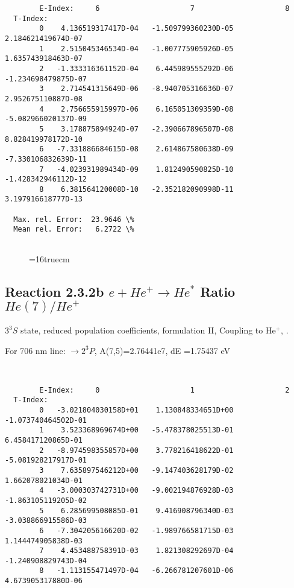 \documentclass[12pt,dvipdfmx]{article}
\begin{document}
{\begin{small}
\begin{verbatim}
        E-Index:     6                     7                     8
  T-Index:
        0    4.136519317417D-04   -1.509799360230D-05    2.184621419674D-07
        1    2.515045346534D-04   -1.007775905926D-05    1.635743918463D-07
        2   -1.333316361152D-04    6.445989555292D-06   -1.234698479875D-07
        3    2.714541315649D-06   -8.940705316636D-07    2.952675110887D-08
        4    2.756655915997D-06    6.165051309359D-08   -5.082966020137D-09
        5    3.178875894924D-07   -2.390667896507D-08    8.828419978172D-10
        6   -7.331886684615D-08    2.614867580638D-09   -7.330106832639D-11
        7   -4.023931989434D-09    1.812490590825D-10   -1.428342946112D-12
        8    6.381564120008D-10   -2.352182090998D-11    3.197916618777D-13

  Max. rel. Error:  23.9646 \%
  Mean rel. Error:   6.2722 \%


\end{verbatim}\end{small}
\begin{figure} \label{2.3.2a}
\epsfxsize=16truecm
\end{figure}
\newpage


\subsection{
  Reaction 2.3.2b $e + He^+ \rightarrow He^*  $ Ratio $He(7)/He^+$
}

  $3^3S$ state,
  reduced population coefficients, formulation II,
  Coupling to He$^+$, \cite{kn:Fujimoto}.

  For 706 nm line: $\rightarrow 2^3P$, A(7,5)=2.76441e7, dE =1.75437 eV

\begin{small}\begin{verbatim}


        E-Index:     0                     1                     2
  T-Index:
        0   -3.021804030158D+01    1.130848334651D+00   -1.073740464502D-01
        1    3.523368969674D+00   -5.478378025513D-01    6.458417120865D-01
        2   -8.974598355857D+00    3.778216418622D-01   -5.081928217917D-01
        3    7.635897546212D+00   -9.147403628179D-02    1.662078021034D-01
        4   -3.000303742731D+00   -9.002194876928D-03   -1.863105119205D-02
        5    6.285699508085D-01    9.416908796340D-03   -3.038866915586D-03
        6   -7.304205616620D-02   -1.989766581715D-03    1.144474905838D-03
        7    4.453488758391D-03    1.821308292697D-04   -1.240908829743D-04
        8   -1.113155471497D-04   -6.266781207601D-06    4.673905317880D-06


\end{verbatim}
\end{small}}
\end{document}

